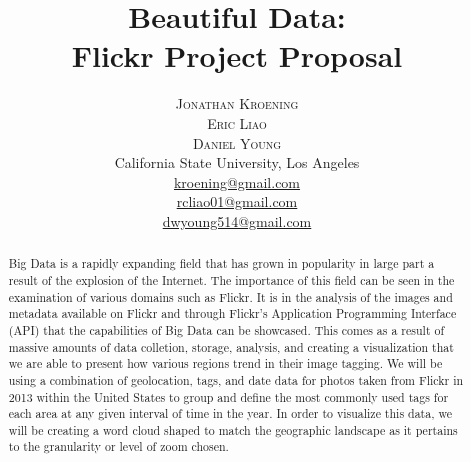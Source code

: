 \documentclass[twoside]{article}
\title{\vspace{-15mm}\fontsize{24pt}{10pt}\selectfont\textbf{Beautiful Data: \\[2mm] Flickr Project Proposal}} %
\author{
\large
\textsc{Jonathan Kroening}\\%
\textsc{Eric Liao}\\%
\textsc{Daniel Young}\\[2mm]
\normalsize California State University, Los Angeles \\[2mm] %
\normalsize \href{mailto:kroening@gmail.com}{kroening@gmail.com}\\ %
\normalsize \href{mailto:rcliao01@gmail.com}{rcliao01@gmail.com}\\ %
\normalsize \href{mailto:dwyoung514@gmail.com}{dwyoung514@gmail.com}\\ %
\vspace{-5mm}
}
\date{}
\begin{document}
\maketitle %

\thispagestyle{fancy} %


\begin{abstract}

\noindent Big Data is a rapidly expanding field that has grown in popularity in large part a result of the explosion of the Internet. The importance of this field can be seen in the examination of various domains such as Flickr. It is in the analysis of the images and metadata available on Flickr and through Flickr's Application Programming Interface (API) that the capabilities of Big Data can be showcased. This comes as a result of massive amounts of data colletion, storage, analysis, and creating a visualization that we are able to present how various regions trend in their image tagging. We will be using a combination of geolocation, tags, and date data for photos taken from Flickr in 2013 within the United States to group and define the most commonly used tags for each area at any given interval of time in the year. In order to visualize this data, we will be creating a word cloud shaped to match the geographic landscape as it pertains to the granularity or level of zoom chosen.

\end{abstract}

\end{document}
